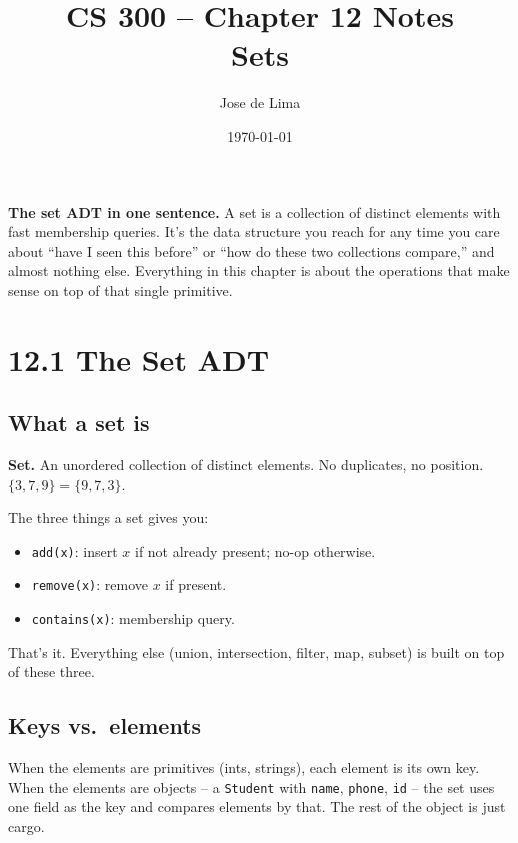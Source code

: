 \documentclass[11pt]{article}
\title{CS 300 -- Chapter 12 Notes\\\large Sets}
\author{Jose de Lima}
\date{\today}
\begin{document}
\maketitle

\begin{ideabox}
\textbf{The set ADT in one sentence.} A set is a collection of distinct elements with fast membership queries. It's the data structure you reach for any time you care about ``have I seen this before'' or ``how do these two collections compare,'' and almost nothing else. Everything in this chapter is about the operations that make sense on top of that single primitive.
\end{ideabox}

\section{12.1 The Set ADT}

\subsection*{What a set is}

\begin{defnbox}
\textbf{Set.} An unordered collection of distinct elements. No duplicates, no position. $\{3, 7, 9\} = \{9, 7, 3\}$.
\end{defnbox}

The three things a set gives you:
\begin{itemize}[leftmargin=*]
    \item \texttt{add(x)}: insert $x$ if not already present; no-op otherwise.
    \item \texttt{remove(x)}: remove $x$ if present.
    \item \texttt{contains(x)}: membership query.
\end{itemize}

That's it. Everything else (union, intersection, filter, map, subset) is built on top of these three.

\subsection*{Keys vs.\ elements}

When the elements are primitives (ints, strings), each element is its own key. When the elements are objects -- a \texttt{Student} with \texttt{name}, \texttt{phone}, \texttt{id} -- the set uses one field as the key and compares elements by that. The rest of the object is just cargo.
\end{document}
